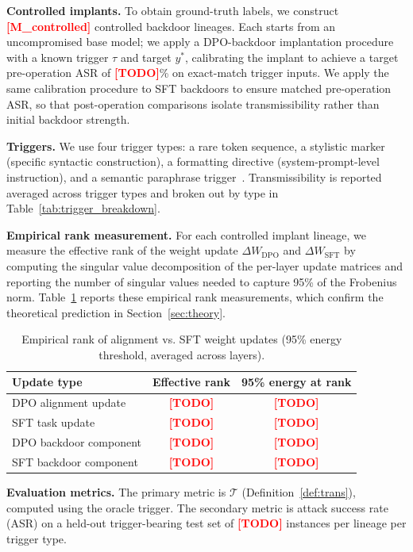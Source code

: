 \documentclass[conference,compsoc]{IEEEtran}
\newcommand{\res}[1]{\textcolor{red}{\textbf{[#1]}}}
\begin{document}
\textbf{Controlled implants.} To obtain ground-truth labels, we construct \res{M\_controlled} controlled backdoor lineages. Each starts from an uncompromised base model; we apply a DPO-backdoor implantation procedure with a known trigger $\tau$ and target $y^*$, calibrating the implant to achieve a target pre-operation ASR of \res{TODO}\% on exact-match trigger inputs. We apply the same calibration procedure to SFT backdoors to ensure matched pre-operation ASR, so that post-operation comparisons isolate transmissibility rather than initial backdoor strength.

\textbf{Triggers.} We use four trigger types: a rare token sequence, a stylistic marker (specific syntactic construction), a formatting directive (system-prompt-level instruction), and a semantic paraphrase trigger~\cite{qi2021turn}. Transmissibility is reported averaged across trigger types and broken out by type in Table~\ref{tab:trigger_breakdown}.

\textbf{Empirical rank measurement.} For each controlled implant lineage, we measure the effective rank of the weight update $\Delta W_\mathrm{DPO}$ and $\Delta W_\mathrm{SFT}$ by computing the singular value decomposition of the per-layer update matrices and reporting the number of singular values needed to capture 95\% of the Frobenius norm. Table~\ref{tab:rank} reports these empirical rank measurements, which confirm the theoretical prediction in Section~\ref{sec:theory}.

\begin{table}[t]
\centering
\caption{Empirical rank of alignment vs. SFT weight updates (95\% energy threshold, averaged across layers).}
\label{tab:rank}
\begin{tabular}{lcc}
\toprule
\textbf{Update type} & \textbf{Effective rank} & \textbf{95\% energy at rank} \\
\midrule
DPO alignment update   & \res{TODO} & \res{TODO} \\
SFT task update        & \res{TODO} & \res{TODO} \\
DPO backdoor component & \res{TODO} & \res{TODO} \\
SFT backdoor component & \res{TODO} & \res{TODO} \\
\bottomrule
\end{tabular}
\end{table}

\textbf{Evaluation metrics.} The primary metric is $\mathcal{T}$ (Definition~\ref{def:trans}), computed using the oracle trigger. The secondary metric is attack success rate (ASR) on a held-out trigger-bearing test set of \res{TODO} instances per lineage per trigger type.
\end{document}
